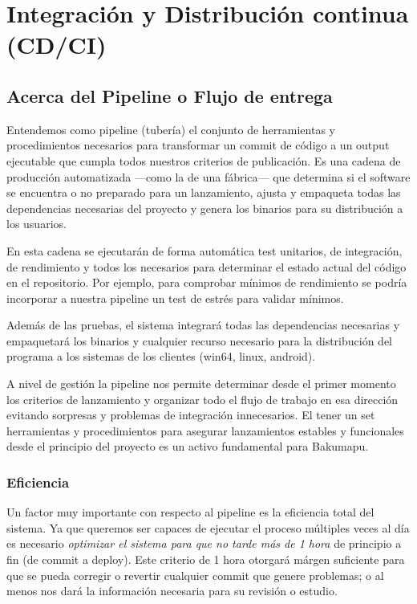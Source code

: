 
\section{Integración y Distribución continua (CD/CI)}\label{pipeline:entrega-continua}

\subsection{Acerca del Pipeline o Flujo de entrega}\label{pipeline:acerca-del-pipeline}

Entendemos como pipeline (tubería) el conjunto de herramientas y procedimientos necesarios para transformar un commit de código a un output ejecutable que cumpla todos nuestros criterios de publicación. Es una cadena de producción automatizada ---como la de una fábrica--- que determina si el software se encuentra o no preparado para un lanzamiento, ajusta y empaqueta todas las dependencias necesarias del proyecto y genera los binarios para su distribución a los usuarios.

En esta cadena se ejecutarán de forma automática test unitarios, de integración, de rendimiento y todos los necesarios para determinar el estado actual del código en el repositorio. Por ejemplo, para comprobar mínimos de rendimiento se podría incorporar a nuestra pipeline un test de estrés para validar  mínimos.

Además de las pruebas, el sistema integrará todas las dependencias necesarias y empaquetará los binarios y cualquier recurso necesario para la distribución del programa a los sistemas de los clientes (win64, linux, android).

A nivel de gestión la pipeline nos permite determinar desde el primer momento los criterios de lanzamiento y organizar todo el flujo de trabajo en esa dirección evitando sorpresas y problemas de integración innecesarios. El tener un set herramientas y procedimientos para asegurar lanzamientos estables y funcionales desde el principio del proyecto es un activo fundamental para Bakumapu.

\subsubsection{Eficiencia}\label{pipeline:eficiencia}

Un factor muy importante con respecto al pipeline es la eficiencia total del sistema. Ya que queremos ser capaces de ejecutar el proceso múltiples veces al día es necesario \emph{optimizar el sistema para que no tarde más de 1 hora} de principio a fin (de commit a deploy). Este criterio de 1 hora otorgará márgen suficiente para que se pueda corregir o revertir cualquier commit que genere problemas; o al menos nos dará la información necesaria para su revisión o estudio.

